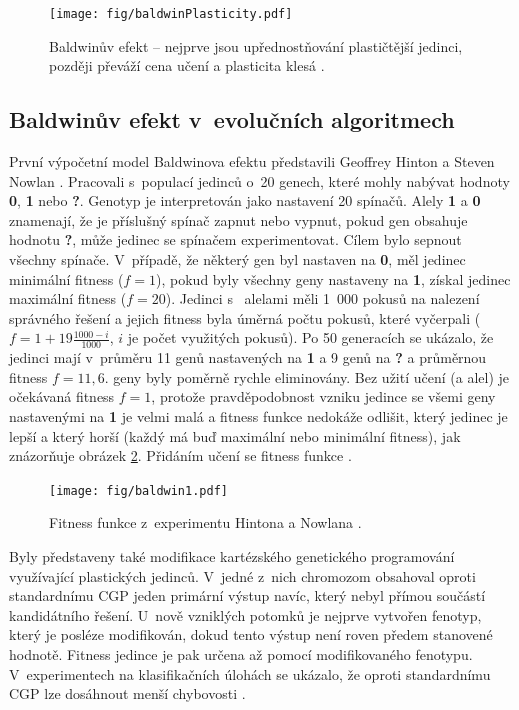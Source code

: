 \begin{figure}[htb]
    \centering\texttt{[image: fig/baldwinPlasticity.pdf]}
    \caption{Baldwinův efekt -- nejprve jsou upřednostňování plastičtější jedinci, později převáží cena učení a plasticita klesá \cite{EllefsenBalancing}.}
    \label{obrBaldwin}
\end{figure}

\subsection{Baldwinův efekt v~evolučních algoritmech}

První výpočetní model Baldwinova efektu představili Geoffrey Hinton a Steven Nowlan \cite{HintonNowlan}. Pracovali s~populací jedinců o~20 genech, které mohly nabývat hodnoty \textbf{0}, \textbf{1} nebo \textbf{?}. Genotyp je interpretován jako nastavení 20 spínačů. Alely \textbf{1} a \textbf{0} znamenají, že je příslušný spínač zapnut nebo vypnut, pokud gen obsahuje hodnotu \textbf{?}, může jedinec se spínačem experimentovat. Cílem bylo sepnout všechny spínače. V~případě, že některý gen byl nastaven na \textbf{0}, měl jedinec minimální fitness ($f = 1$), pokud byly všechny geny nastaveny na \textbf{1}, získal jedinec maximální fitness ($f = 20$). Jedinci s~ alelami měli 1~000 pokusů na nalezení správného řešení a jejich fitness byla úměrná počtu pokusů, které vyčerpali ($f = 1 + 19 \frac{1000 - i}{1000}$, $i$ je počet využitých pokusů). Po 50 generacích se ukázalo, že jedinci mají v~průměru 11 genů nastavených na \textbf{1} a 9 genů na \textbf{?} a průměrnou fitness $f = 11,6$.  geny byly poměrně rychle eliminovány. Bez užití učení (a  alel) je očekávaná fitness $f = 1$, protože pravděpodobnost vzniku jedince se všemi geny nastavenými na \textbf{1} je velmi malá a fitness funkce nedokáže odlišit, který jedinec je lepší a který horší (každý má buď maximální nebo minimální fitness), jak znázorňuje obrázek \ref{obrHintonNowlan}. Přidáním učení se fitness funkce .

\begin{figure}[htb]
    \centering\texttt{[image: fig/baldwin1.pdf]}
    \caption{Fitness funkce z~experimentu Hintona a Nowlana \cite{HintonNowlan}.}
    \label{obrHintonNowlan}
\end{figure}

Byly představeny také modifikace kartézského genetického programování využívající plastických jedinců.
V~jedné z~nich chromozom obsahoval oproti standardnímu CGP jeden primární výstup navíc, který nebyl přímou součástí kandidátního řešení. U~nově vzniklých potomků je nejprve vytvořen fenotyp, který je posléze modifikován, dokud tento výstup není roven předem stanovené hodnotě. Fitness jedince je pak určena až pomocí modifikovaného fenotypu. V~experimentech na klasifikačních úlohách se ukázalo, že oproti standardnímu CGP lze dosáhnout menší chybovosti \cite{UllahPlasticCGP}.

